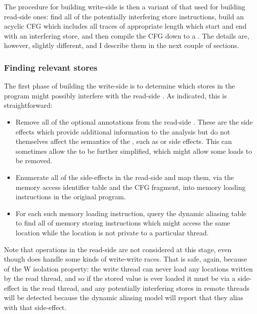 The procedure for building write-side {\StateMachines} is then a
variant of that used for building read-side ones: find all of the
potentially interfering store instructions, build an acyclic CFG which
includes all traces of appropriate length which start and end with an
interfering store, and then compile the CFG down to a {\StateMachine}.
The details are, however, slightly different, and I describe them in
the next couple of sections.

\subsubsection{Finding relevant stores}

The first phase of building the write-side \StateMachines is to
determine which stores in the program might possibly interfere with
the read-side {\StateMachine}.  As indicated, this is straightforward:

\begin{itemize}
\item
  Remove all of the optional annotations from the read-side
  \StateMachine.  These are the side effects which provide additional
  information to the analysis but do not themselves affect the
  semantics of the \StateMachine, such as  or
   side effects.  This can sometimes allow the
  {\StateMachine} to be further simplified, which might allow
  some loads to be removed.  
\item
  Enumerate all of the  side-effects in the read-side
  {\StateMachine} and map them, via the memory access identifier table
  and the CFG fragment, into memory loading instructions in the original program.
\item
  For each such memory loading instruction, query the dynamic aliasing
  table to find all of memory storing instructions which might access
  the same location while the location is not private to a particular
  thread.
\end{itemize}

Note that  operations in the read-side {\StateMachine}
are not considered at this stage, even though {\technique} does handle
some kinds of write-write races.  That is safe, again, because of the
W isolation property: the write thread can never load any locations
written by the read thread, and so if the stored value is ever loaded
it must be via a  side-effect in the read thread, and any
potentially interfering stores in remote threads will be detected
because the dynamic aliasing model will report that they alias with
that  side-effect.

